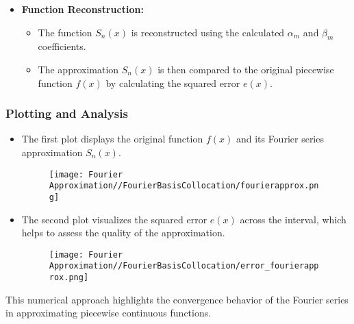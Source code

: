 \documentclass[12pt]{report} %
\begin{document}
\begin{itemize}
    \item \textbf{Function Reconstruction:}
    \begin{itemize}
        \item The function \( S_n(x) \) is reconstructed using the calculated \( \alpha_m \) and \( \beta_m \) coefficients.
        \item The approximation \( S_n(x) \) is then compared to the original piecewise function \( f(x) \) by calculating the squared error \( e(x) \).
    \end{itemize}
\end{itemize}

\subsubsection*{Plotting and Analysis}
\begin{itemize}
    \item The first plot displays the original function \( f(x) \) and its Fourier series approximation \( S_n(x) \).
    \begin{figure}[H]
        \centering
        \texttt{[image: Fourier Approximation//FourierBasisCollocation/fourierapprox.png]}
        \label{fig:enter-label}
    \end{figure}
    \item The second plot visualizes the squared error \( e(x) \) across the interval, which helps to assess the quality of the approximation.
    \begin{figure}[H]
        \centering
        \texttt{[image: Fourier Approximation//FourierBasisCollocation/error\_fourierapprox.png]}
        \label{fig:enter-label}
    \end{figure}
\end{itemize}
This numerical approach highlights the convergence behavior of the Fourier series in approximating piecewise continuous functions.
\end{document}
